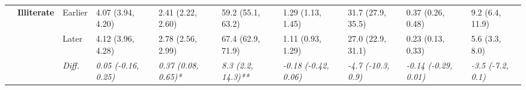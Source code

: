 \documentclass[12pt, a4paper]{article}
\begin{document}
\begin{appendices}
\begin{table}[!p]
{\begin{tabular}[t]{>{}l>{}lllllllll}
        \cmidrule{2-10}
                                              & \multirow{3}{*}{\textbf{Illiterate}} & Earlier                       & 4.07 (3.94, 4.20)                           & 2.41 (2.22, 2.60)                           & 59.2 (55.1, 63.2)                           & 1.29 (1.13, 1.45)                             & 31.7 (27.9, 35.5)                           & 0.37 (0.26, 0.48)                               & 9.2 (6.4, 11.9)                               \\
        \cmidrule{3-10}
                                              &                                      & Later                         & 4.12 (3.96, 4.28)                           & 2.78 (2.56, 2.99)                           & 67.4 (62.9, 71.9)                           & 1.11 (0.93, 1.29)                             & 27.0 (22.9, 31.1)                           & 0.23 (0.13, 0.33)                               & 5.6 (3.3, 8.0)                                \\
        \cmidrule{3-10}
                                              &                                      & \cellcolor{gray!10}\em{Diff.} & \cellcolor{gray!10}\em{0.05 (-0.16, 0.25)}  & \cellcolor{gray!10}\em{0.37 (0.08, 0.65)*}  & \cellcolor{gray!10}\em{8.3 (2.2, 14.3)**}   & \cellcolor{gray!10}\em{-0.18 (-0.42, 0.06)}   & \cellcolor{gray!10}\em{-4.7 (-10.3, 0.9)}   & \cellcolor{gray!10}\em{-0.14 (-0.29, 0.01)}     & \cellcolor{gray!10}\em{-3.5 (-7.2, 0.1)}      \\
        \bottomrule
      \end{tabular}}
  \end{table}
  \vspace*{\fill}


\end{appendices}
\end{document}
